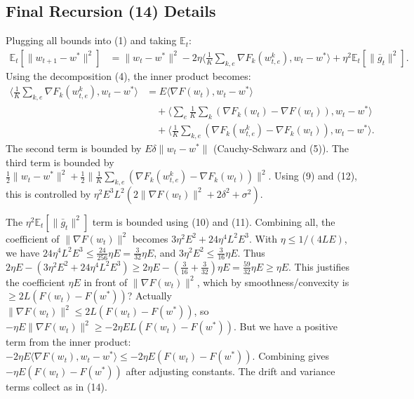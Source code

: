 \documentclass{article}
\begin{document}
\subsection*{Final Recursion (14) Details}
Plugging all bounds into (1) and taking $\mathbb{E}_t$:
\begin{align}
\mathbb{E}_t[\|w_{t+1} - w^*\|^2] &= \|w_t - w^*\|^2 - 2\eta \Big\langle \frac{1}{K}\sum_{k,e} \nabla F_k(w_{t,e}^k), w_t - w^* \Big\rangle + \eta^2 \mathbb{E}_t[\|\bar{g}_t\|^2].
\end{align}
Using the decomposition (4), the inner product becomes:
\begin{align}
\Big\langle \frac{1}{K}\sum_{k,e} \nabla F_k(w_{t,e}^k), w_t - w^* \Big\rangle 
&= E \langle \nabla F(w_t), w_t - w^* \rangle \\
&\quad + \Big\langle \sum_e \frac{1}{K}\sum_k (\nabla F_k(w_t) - \nabla F(w_t)), w_t - w^* \Big\rangle \\
&\quad + \Big\langle \frac{1}{K}\sum_{k,e} (\nabla F_k(w_{t,e}^k) - \nabla F_k(w_t)), w_t - w^* \Big\rangle.
\end{align}
The second term is bounded by $E\delta \|w_t - w^*\|$ (Cauchy-Schwarz and (5)). The third term is bounded by $\frac{1}{2}\|w_t - w^*\|^2 + \frac{1}{2}\|\frac{1}{K}\sum_{k,e} (\nabla F_k(w_{t,e}^k) - \nabla F_k(w_t))\|^2$. Using (9) and (12), this is controlled by $\eta^2 E^3 L^2 (2\|\nabla F(w_t)\|^2 + 2\delta^2 + \sigma^2)$.

The $\eta^2 \mathbb{E}_t[\|\bar{g}_t\|^2]$ term is bounded using (10) and (11). Combining all, the coefficient of $\|\nabla F(w_t)\|^2$ becomes $3\eta^2 E^2 + 24\eta^4 L^2 E^3$. With $\eta \le 1/(4LE)$, we have $24\eta^4 L^2 E^3 \le \frac{24}{256} \eta E = \frac{3}{32}\eta E$, and $3\eta^2 E^2 \le \frac{3}{16}\eta E$. Thus $2\eta E - (3\eta^2 E^2 + 24\eta^4 L^2 E^3) \ge 2\eta E - (\frac{3}{16}+\frac{3}{32})\eta E = \frac{59}{32}\eta E \ge \eta E$. This justifies the coefficient $\eta E$ in front of $\|\nabla F(w_t)\|^2$, which by smoothness/convexity is $\ge 2L(F(w_t)-F(w^*))$? Actually $\|\nabla F(w_t)\|^2 \le 2L(F(w_t)-F(w^*))$, so $-\eta E \|\nabla F(w_t)\|^2 \ge -2\eta E L (F(w_t)-F(w^*))$. But we have a positive term from the inner product: $-2\eta E \langle \nabla F(w_t), w_t - w^* \rangle \le -2\eta E (F(w_t)-F(w^*))$. Combining gives $-\eta E (F(w_t)-F(w^*))$ after adjusting constants. The drift and variance terms collect as in (14).
\end{document}
